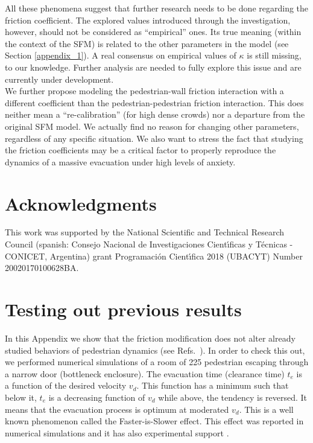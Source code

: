 \documentclass[preprint,12pt]{elsarticle}
\begin{document}
All these phenomena suggest that further research needs to be  
done regarding the friction coefficient. The explored values 
introduced through the investigation, however, should not be considered as 
``empirical'' ones. Its true meaning (within the context of the SFM) is related 
to the other parameters in the model (see Section \ref{appendix_1}). A real consensus 
on empirical values of $\kappa$ is still missing, to our knowledge. Further analysis are needed to fully explore this issue and are currently under development. \\


We further propose modeling the pedestrian-wall friction 
interaction with a different coefficient than the pedestrian-pedestrian friction 
interaction. This does neither mean a ``re-calibration'' (for 
high dense crowds) nor a departure from the original SFM model. 
We actually find no reason for changing other parameters, regardless of any 
specific situation. We also want to stress the fact that studying the friction 
coefficients may be a critical factor to properly reproduce the dynamics of a 
massive evacuation under high levels of anxiety. 
\\  

\section*{Acknowledgments}
This work was supported by the National Scientific and Technical 
Research Council (spanish: Consejo Nacional de Investigaciones Cient\'\i ficas 
y T\'ecnicas - CONICET, Argentina) grant Programaci\'on Cient\'\i fica 2018 (UBACYT) Number 20020170100628BA.

\appendix



\section{\label{appendix_3} Testing out previous results}


In this Appendix we show that the friction modification does not alter already 
studied behaviors of pedestrian dynamics (see 
Refs.~\cite{Dorso2,Dorso1,Dorso3}). In order to check this out, we performed 
numerical simulations of a room of 225 pedestrian escaping through a narrow door 
(bottleneck enclosure). The evacuation time (clearance time) $t_e$ is a function 
of the desired velocity $v_d$. This function has a minimum such that below it, 
$t_e$ is a decreasing function of $v_d$ while above, the tendency is reversed. 
It means that the evacuation process is optimum at moderated $v_d$. This is a 
well known phenomenon called the Faster-is-Slower effect. This effect was 
reported in numerical simulations \cite{Dorso1,Dorso5} and it has also 
experimental support \cite{parisi1}. \\
\end{document}
